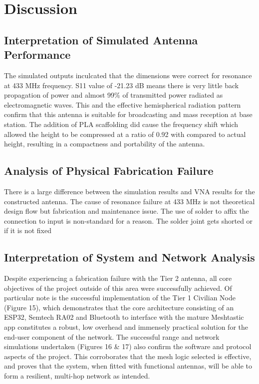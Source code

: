 \chapter{Discussion}
\label{Chapter5}

\section{Interpretation of Simulated Antenna Performance}

The simulated outputs inculcated that the dimensions were correct for resonance at 433 MHz frequency. S11 value of -21.23 dB means there is very little back propagation of power and almost 99\% of transmitted power radiated as electromagnetic waves.  This and the effective hemispherical radiation pattern confirm that this antenna is suitable for broadcasting and mass reception at base station. The addition of PLA scaffolding did cause the frequency shift which allowed the height to be compressed at a ratio of 0.92 with compared to actual height, resulting in a compactness and portability of the antenna. 

\section{Analysis of Physical Fabrication Failure}

There is a large difference between the simulation results and VNA results for the constructed antenna. The cause of resonance failure at 433 MHz is not theoretical design flow but fabrication and maintenance issue. The use of solder to affix the connection to input is non-standard for a reason. The solder joint gets shorted or if it is not fixed  

\section{Interpretation of System and Network Analysis}

Despite experiencing a fabrication failure with the Tier 2 antenna, all core objectives of the project outside of this area were successfully achieved. Of particular note is the successful implementation of the Tier 1 Civilian Node (Figure 15), which demonstrates that the core architecture consisting of an ESP32, Semtech RA02 and Bluetooth to interface with the mature Meshtastic app constitutes a robust, low overhead and immensely practical solution for the end-user component of the network. The successful range and network simulations undertaken (Figures 16 \& 17) also confirm the software and protocol aspects of the project. This corroborates that the mesh logic selected is effective, and proves that the system, when fitted with functional antennas, will be able to form a resilient, multi-hop network as intended. 

